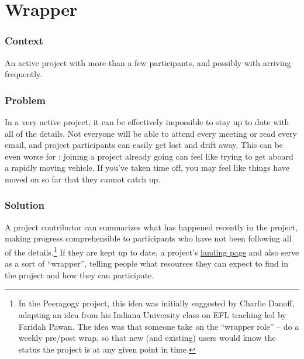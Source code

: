 \section{Wrapper}\label{sec:Wrapper}

\subsubsection*{Context} An active project with more than a few participants, and possibly with  arriving frequently.  

\subsubsection*{Problem} In a very active project, it can be effectively impossible to stay up to date with all of the details.  Not everyone will be able to attend every meeting or read every email, and project participants can easily get lost and drift away.  This can be even worse for : joining a project already going can feel like trying to get aboard a rapidly moving vehicle.  If you've taken time off, you may feel like things have moved on so far that they cannot catch up. 

\subsubsection*{Solution}
A project contributor can summarizes what has happened recently in the project, making progress comprehensible to participants who have not been following all of the details.\footnote{In the Peeragogy project, this idea was initially suggested by Charlie Danoff, adapting an idea from his Indiana University class on EFL teaching led by Faridah Pawan. The idea was that someone take on the ``wrapper role'' -- do a weekly pre/post wrap, so that new (and existing) users would know the status the project is at any given point in time.}  If they are kept up to date, a project's \href{http://socialmediaclassroom.com/host/peeragogy/}{landing page} and  also serve as a sort of ``wrapper'', telling people what resources they can expect to find in the project and how they can participate.

